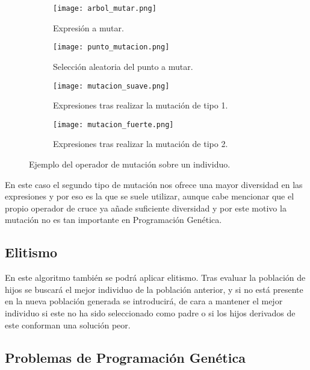 \begin{figure}[H]
    \centering
	 \begin{subfigure}[b]{0.49\textwidth}
		 \centering
		 \texttt{[image: arbol\_mutar.png]}
		 \caption{Expresión a mutar.}
		 \label{fig:arbol_mutar}
	 \end{subfigure}
	\begin{subfigure}[b]{0.49\textwidth}
		 \centering
		\texttt{[image: punto\_mutacion.png]}
		\caption{Selección aleatoria del punto a mutar.}
		\label{fig:punto_mutacion}
   \end{subfigure}

	\begin{subfigure}[b]{0.49\textwidth}
		\centering
	  \texttt{[image: mutacion\_suave.png]}
	  \caption{Expresiones tras realizar la mutación de tipo 1.}
	  \label{fig:mutacion_suave}
   \end{subfigure}
	\begin{subfigure}[b]{0.49\textwidth}
		\centering
	  \texttt{[image: mutacion\_fuerte.png]}
	  \caption{Expresiones tras realizar la mutación de tipo 2.}
	  \label{fig:mutacion_fuerte}
	\end{subfigure}

	\caption{Ejemplo del operador de mutación sobre un individuo.}
	\label{fig:ej_mutacion_GP}
\end{figure}

En este caso el segundo tipo de mutación nos ofrece una mayor diversidad en las expresiones y por eso es la que se suele utilizar, aunque cabe mencionar que el propio operador de cruce ya añade suficiente diversidad y por este motivo la mutación no es tan importante en Programación Genética.


\subsection{Elitismo}

En este algoritmo también se podrá aplicar elitismo. Tras evaluar la población de hijos se buscará el mejor individuo de la población anterior, y si no está presente en la nueva población generada se introducirá, de cara a mantener el mejor individuo si este no ha sido seleccionado como padre o si los hijos derivados de este conforman una solución peor.


\subsection{Problemas de Programación Genética}

